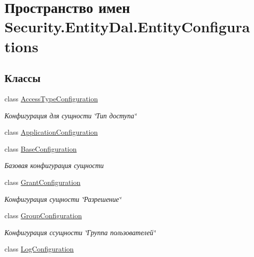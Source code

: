 \hypertarget{namespace_security_1_1_entity_dal_1_1_entity_configurations}{}\section{Пространство имен Security.\+Entity\+Dal.\+Entity\+Configurations}
\label{namespace_security_1_1_entity_dal_1_1_entity_configurations}
\subsection*{Классы}
\begin{DoxyCompactItemize}
\item 
class \hyperlink{class_security_1_1_entity_dal_1_1_entity_configurations_1_1_access_type_configuration}{Access\+Type\+Configuration}
\begin{DoxyCompactList}\small\item\em Конфигурация для сущности \char`\"{}Тип доступа\char`\"{} \end{DoxyCompactList}\item 
class \hyperlink{class_security_1_1_entity_dal_1_1_entity_configurations_1_1_application_configuration}{Application\+Configuration}
\item 
class \hyperlink{class_security_1_1_entity_dal_1_1_entity_configurations_1_1_base_configuration}{Base\+Configuration}
\begin{DoxyCompactList}\small\item\em Базовая конфигурация сущности \end{DoxyCompactList}\item 
class \hyperlink{class_security_1_1_entity_dal_1_1_entity_configurations_1_1_grant_configuration}{Grant\+Configuration}
\begin{DoxyCompactList}\small\item\em Конфигурация сущности \char`\"{}Разрешение\char`\"{} \end{DoxyCompactList}\item 
class \hyperlink{class_security_1_1_entity_dal_1_1_entity_configurations_1_1_group_configuration}{Group\+Configuration}
\begin{DoxyCompactList}\small\item\em Конфигурация ссущности \char`\"{}Группа пользователей\char`\"{} \end{DoxyCompactList}\item 
class \hyperlink{class_security_1_1_entity_dal_1_1_entity_configurations_1_1_log_configuration}{Log\+Configuration}

\end{DoxyCompactItemize}
